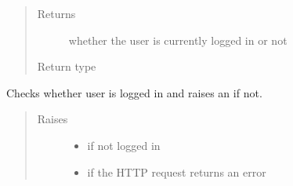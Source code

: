 \documentclass[letterpaper,10pt,english]{sphinxmanual}
\begin{document}
\begin{fulllineitems}
\begin{fulllineitems}
\begin{quote}
\begin{description}
\item[{Returns}] \leavevmode
\sphinxAtStartPar
whether the user is currently logged in or not

\item[{Return type}] \leavevmode
\sphinxAtStartPar
{}

\end{description}\end{quote}

\end{fulllineitems}


\begin{fulllineitems}
\label{\detokenize{autoapi/pine/client/index:pine.client.PineClient._check_login}}
\sphinxAtStartPar
Checks whether user is logged in and raises an {\hyperref[\detokenize{autoapi/pine/client/exceptions/index:pine.client.exceptions.PineClientAuthException}]{}} if not.
\begin{quote}\begin{description}
\item[{Raises}] \leavevmode\begin{itemize}
\item {} 
\sphinxAtStartPar
{\hyperref[\detokenize{autoapi/pine/client/exceptions/index:pine.client.exceptions.PineClientAuthException}]{}} \textendash{} if not logged in

\item {} 
\sphinxAtStartPar
{\hyperref[\detokenize{autoapi/pine/client/exceptions/index:pine.client.exceptions.PineClientHttpException}]{}} \textendash{} if the HTTP request returns an error

\end{itemize}

\end{description}\end{quote}

\end{fulllineitems}


\end{fulllineitems}
\end{document}
